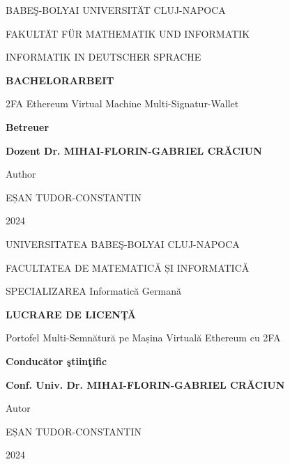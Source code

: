 \documentclass[12pt]{report}
\begin{document}
	
	\begin{titlepage}
		\centering
		{\large BABEŞ-BOLYAI UNIVERSITÄT CLUJ-NAPOCA\par}
		\vspace{0.5cm}
		{\large FAKULTÄT FÜR MATHEMATIK UND INFORMATIK\par}
		\vspace{0.5cm}
		{\large INFORMATIK IN DEUTSCHER SPRACHE\par}
		\vspace{2cm}
		{\LARGE\bfseries BACHELORARBEIT\par}
		\vspace{2cm}
		{\Large 2FA Ethereum Virtual Machine Multi-Signatur-Wallet\par}
		\vfill
		\begin{flushleft}
			{\large \textbf{Betreuer}\par}
			\vspace{0.2cm}
			\parbox{10cm}{\large \textbf{Dozent Dr. MIHAI-FLORIN-GABRIEL CRĂCIUN}\par}
		\end{flushleft}
		\vspace{1.5cm}
		\begin{flushright}
			{\large Author\par}
			{\large EȘAN TUDOR-CONSTANTIN\par}
			\vspace{1cm}
			{\large 2024\par}
		\end{flushright}
	\end{titlepage}
	
	\newpage
	\begin{titlepage}
		\centering
		{\large UNIVERSITATEA BABEŞ-BOLYAI CLUJ-NAPOCA\par}
		\vspace{0.5cm}
		{\large FACULTATEA DE MATEMATICĂ ȘI INFORMATICĂ\par}
		\vspace{0.5cm}
		{\large SPECIALIZAREA Informatică Germană\par}
		\vspace{2cm}
		{\LARGE\bfseries LUCRARE DE LICENȚĂ\par}
		\vspace{2cm}
		{\Large Portofel Multi-Semnătură pe Mașina Virtuală Ethereum cu 2FA\par}
		\vfill
		\begin{flushleft}
			{\large \textbf{Conducător ştiinţific}\par}
						\vspace{0.2cm}
			\parbox{11cm}{\large \textbf{Conf. Univ. Dr. MIHAI-FLORIN-GABRIEL CRĂCIUN}}
		\end{flushleft}
		\vspace{1.5cm}
		\begin{flushright}
			{\large Autor\par}
			{\large EȘAN TUDOR-CONSTANTIN\par}
			\vspace{1cm}
			{\large 2024\par}
		\end{flushright}
	\end{titlepage}
	
\end{document}
